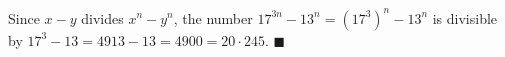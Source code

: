 Since $x-y$ divides $x^n-y^n$, the number $17^{3n}-13^n=(17^3)^n-13^n$ is divisible by $17^3-13=4913-13=4900=20\cdot245$. $\blacksquare$
